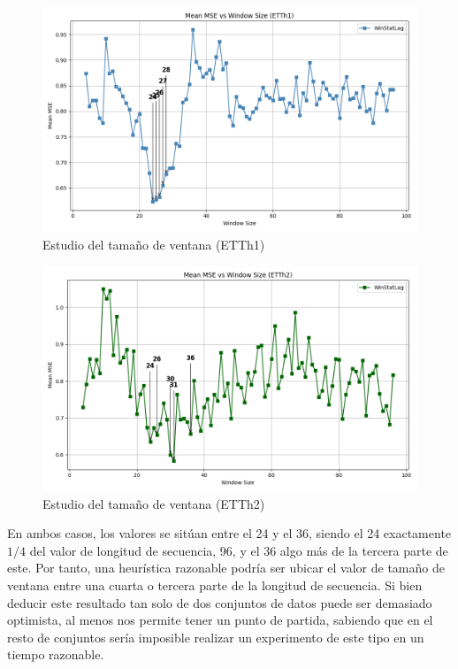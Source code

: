 \begin{figure}[H]
	\centering
	\includegraphics[scale=0.475]{img/mean_mse_vs_window_ETTh1}
	\caption{Estudio del tamaño de ventana (ETTh1)}
	\label{mean_mse_vs_window_ETTh1}
\end{figure}


\begin{figure}[H]
	\centering
	\includegraphics[scale=0.475]{img/mean_mse_vs_window_ETTh2}
	\caption{Estudio del tamaño de ventana (ETTh2)}
	\label{mean_mse_vs_window_ETTh2}
\end{figure}

En ambos casos, los valores se sitúan entre el 24 y el 36, siendo el 24 exactamente $1/4$ del valor de longitud de secuencia, 96, y el 36 algo más de la tercera parte de este. Por tanto, una heurística razonable podría ser ubicar el valor de tamaño de ventana entre una cuarta o tercera parte de la longitud de secuencia. Si bien deducir este resultado tan solo de dos conjuntos de datos puede ser demasiado optimista, al menos nos permite tener un punto de partida, sabiendo que en el resto de conjuntos sería imposible realizar un experimento de este tipo en un tiempo razonable.

